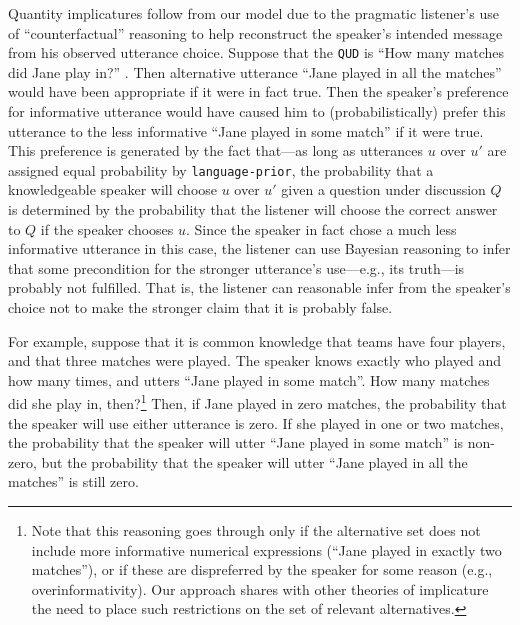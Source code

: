 \documentclass[pdfextras]{handbook}
\begin{document}
Quantity implicatures follow from our model due to the pragmatic listener's use of ``counterfactual'' reasoning to help reconstruct the speaker's intended message from his observed utterance choice.
Suppose that the \lstinline{QUD} is ``How many matches did Jane play in?''
. 
Then alternative utterance ``Jane played in all the matches'' would have been appropriate if it were in fact true. Then the speaker's preference for informative utterance would have caused him to (probabilistically) prefer this utterance to the less informative ``Jane played in some match'' if it were true. 
This preference is generated by the fact that---as long as utterances $u$ over $u'$ are assigned equal probability by \lstinline{language-prior}, the probability that a knowledgeable speaker will choose $u$ over $u'$ given a question under discussion $Q$ is determined by the probability that the listener will choose the correct answer to $Q$ if the speaker chooses $u$.
Since the speaker in fact chose a much less informative utterance in this case, the listener can use Bayesian reasoning to infer that some precondition for the stronger utterance's use---e.g., its truth---is probably not fulfilled. 
That is, the listener can reasonable infer from the speaker's choice not to make the stronger claim that it is probably false.

For example, suppose that it is common knowledge that teams have four players, and that three matches were played. The speaker knows exactly who played and how many times, and utters ``Jane played in some match''. How many matches did she play in, then?\footnote{Note that this reasoning goes through only if the alternative set does not include more informative numerical expressions (``Jane played in exactly two matches''), or if these are dispreferred by the speaker for some reason (e.g., overinformativity). Our approach shares with other theories of implicature the need to place such restrictions on the set of relevant alternatives.} Then, if Jane played in zero matches, the probability that the speaker will use either utterance is zero. If she played in one or two matches, the probability that the speaker will utter ``Jane played in some match'' is non-zero, but the probability that the speaker will utter ``Jane played in all the matches'' is still zero. 
\end{document}
